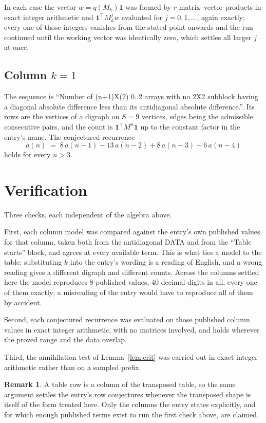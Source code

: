 \documentclass[11pt,a4paper]{article}
\theoremstyle{plain}
\theoremstyle{definition}
\newtheorem{remark}[theorem]{Remark}
\begin{document}
In each case the vector $w=q(M_k)\mathbf{1}$ was formed by $r$ matrix--vector products in
exact integer arithmetic and $\mathbf{1}^{\!\top}M_k^{j}w$ evaluated for $j=0,1,\dots$,
again exactly; every one of those integers vanishes from the stated point onwards and the run
continued until the working vector was identically zero, which settles all larger $j$ at once.

\subsection*{Column $k=1$}
The sequence is ``Number of (n+1)X(2) 0..2 arrays with no 2X2 subblock having a diagonal absolute difference less than its antidiagonal absolute difference.''. Its rows are the vertices of a digraph on
$S=9$ vertices, edges being the admissible consecutive pairs, and the count is
$\mathbf{1}^{\!\top}M^{n}\mathbf{1}$ up to the constant factor in the entry's name.
The conjectured recurrence
\[
a(n)\;=\;8\,a(n-1) - 13\,a(n-2) + 8\,a(n-3) - 6\,a(n-4)
\]
holds for every $n>3$.

\section{Verification}

Three checks, each independent of the algebra above.

First, each column model was compared against the entry's own published values for that
column, taken both from the antidiagonal DATA and from the ``Table starts'' block, and agrees
at every available term. This is what ties a model to the table: substituting $k$ into the
entry's wording is a reading of English, and a wrong reading gives a different digraph and
different counts. Across the columns settled here the model reproduces $8$ published
values, $40$ decimal digits in all, every one of them exactly; a misreading of the entry
would have to reproduce all of them by accident.

Second, each conjectured recurrence was evaluated on those published column values in exact
integer arithmetic, with no matrices involved, and holds wherever the proved range and the
data overlap.

Third, the annihilation test of Lemma~\ref{lem:crit} was carried out in exact integer
arithmetic rather than on a sampled prefix.

\begin{remark}
A table row is a column of the transposed table, so the same argument settles the entry's row
conjectures whenever the transposed shape is itself of the form treated here. Only the columns
the entry states explicitly, and for which enough published terms exist to run the first check
above, are claimed.
\end{remark}
\end{document}
